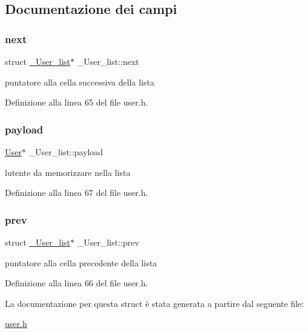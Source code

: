 \subsection{Documentazione dei campi}
\mbox{\label{struct__User__list_a7bcce2696ed06ecd665b624ca9413620}} 
\subsubsection{\texorpdfstring{next}{next}}
{\footnotesize\ttfamily struct \hyperlink{struct__User__list}{\+\_\+\+User\+\_\+list}$\ast$ \+\_\+\+User\+\_\+list\+::next}



puntatore alla cella successiva della lista 



Definizione alla linea 65 del file user.\+h.

\mbox{\label{struct__User__list_a9c6cbd743c8c9ec40a0372615c55fce2}} 
\subsubsection{\texorpdfstring{payload}{payload}}
{\footnotesize\ttfamily \hyperlink{structUser}{User}$\ast$ \+\_\+\+User\+\_\+list\+::payload}



l\textquotesingle{}utente da memorizzare nella lista 



Definizione alla linea 67 del file user.\+h.

\mbox{\label{struct__User__list_aab81902c179f0f2d16d7f90396f1f030}} 
\subsubsection{\texorpdfstring{prev}{prev}}
{\footnotesize\ttfamily struct \hyperlink{struct__User__list}{\+\_\+\+User\+\_\+list}$\ast$ \+\_\+\+User\+\_\+list\+::prev}



puntatore alla cella precedente della lista 



Definizione alla linea 66 del file user.\+h.



La documentazione per questa struct è stata generata a partire dal seguente file\+:\begin{DoxyCompactItemize}
\item 
\hyperlink{user_8h}{user.\+h}\end{DoxyCompactItemize}
